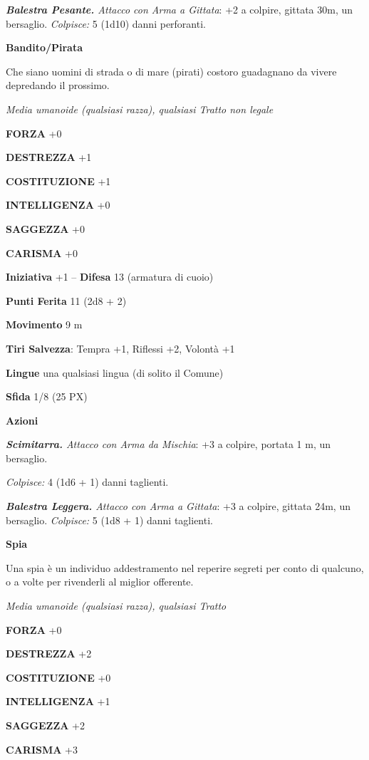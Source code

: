 \begin{multicols}{2}
\textit{\textbf{Balestra Pesante.} Attacco con Arma a Gittata}: +2 a colpire, gittata 30m, un bersaglio. \textit{Colpisce:} 5 (1d10) danni perforanti.

\medskip\textbf{Bandito/Pirata}

Che siano uomini di strada o di mare (pirati) costoro guadagnano da vivere depredando il prossimo.

\textit{Media umanoide (qualsiasi razza), qualsiasi Tratto non legale}

\textbf{FORZA} +0

\textbf{DESTREZZA} +1

\textbf{COSTITUZIONE} +1

\textbf{INTELLIGENZA} +0

\textbf{SAGGEZZA} +0

\textbf{CARISMA} +0

\textbf{Iniziativa} +1 -- \textbf{Difesa} 13 (armatura di cuoio)

\textbf{Punti Ferita} 11 (2d8 + 2)

\textbf{Movimento} 9 m

\textbf{Tiri Salvezza}: Tempra +1, Riflessi +2, Volontà +1

\textbf{Lingue} una qualsiasi lingua (di solito il Comune)

\textbf{Sfida} 1/8 (25 PX)

\textbf{Azioni}

\textit{\textbf{Scimitarra.} Attacco con Arma da Mischia}: +3 a colpire, portata 1 m, un bersaglio.

\textit{Colpisce:} 4 (1d6 + 1) danni taglienti.

\textit{\textbf{Balestra Leggera.} Attacco con Arma a Gittata}: +3 a colpire, gittata 24m, un bersaglio. \textit{Colpisce:} 5 (1d8 + 1) danni taglienti.

\medskip\textbf{Spia}

Una spia è un individuo addestramento nel reperire segreti per conto di qualcuno, o a volte per rivenderli al miglior offerente.

\textit{Media umanoide (qualsiasi razza), qualsiasi Tratto}

\textbf{FORZA} +0

\textbf{DESTREZZA} +2

\textbf{COSTITUZIONE} +0

\textbf{INTELLIGENZA} +1

\textbf{SAGGEZZA} +2

\textbf{CARISMA} +3


\end{multicols}
